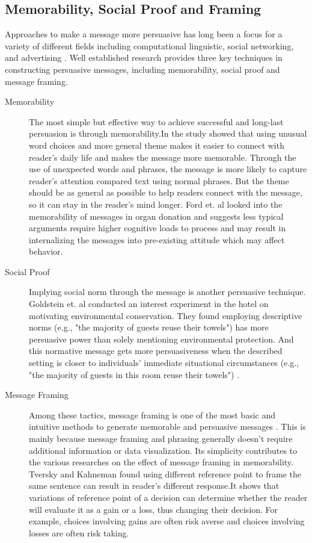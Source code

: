 \subsection{Memorability, Social Proof and Framing}
Approaches to make a message more persuasive has long been a focus for a variety of different fields including computational linguistic, social networking, and advertising \cite{smith1996message,tversky1981framing,danescu2012you,huntertowards,maheswaran1990influence,grewal1994moderating}. Well established research provides three key techniques in constructing persuasive messages, including memorability, social proof and message framing.

\begin{description}
\item[Memorability]
The most simple but effective way to achieve successful and long-last persuasion is through memorability.In \cite{danescu2012you} the study showed that using unusual word choices and more general theme makes it easier to connect with reader's daily life and makes the message more memorable. Through the use of unexpected words and phrases, the message is more likely to capture reader's attention compared text using normal phrases. But the theme should be as general as possible to help readers connect with the message, so it can stay in the reader's mind longer.
Ford et. al \cite{ford1991memorability} looked into the memorability of messages in organ donation and suggests less typical arguments require higher cognitive loads to process and may result in internalizing the messages into pre-existing attitude which may affect behavior. 

\item[Social Proof]
Implying social norm through the message is another persuasive technique.  Goldstein et. al conducted an interest experiment in the hotel on motivating environmental conservation. They found employing descriptive norms (e.g., "the majority of guests reuse their towels") has more persuasive power than solely mentioning environmental protection. And this normative message gets more persuasiveness when the described setting is closer to individuals' immediate situational circumstances (e.g., "the majority of guests in this room reuse their towels") \cite{goldstein2008room}.

\item[Message Framing]
Among these tactics, message framing is one of the most basic and intuitive methods to generate memorable and persuasive messages \cite{smith1996message,tversky1981framing}. This is mainly because message framing and phrasing generally doesn't require additional information or data visualization. Its simplicity contributes to the various researches on the effect of message framing in memorability. Tversky and Kahneman found using different reference point to frame the same sentence can result in reader's different response\cite{tversky1992advances,tversky1981framing,kahneman1984choices}.It shows that variations of reference point of a decision can determine whether the reader will evaluate it as a gain or a loss, thus changing their decision. For example, choices involving gains are often risk averse and choices involving losses are often risk taking.


\end{description}
